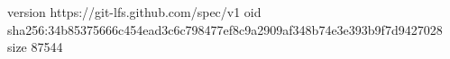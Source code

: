 version https://git-lfs.github.com/spec/v1
oid sha256:34b85375666c454ead3c6c798477ef8c9a2909af348b74e3e393b9f7d9427028
size 87544

